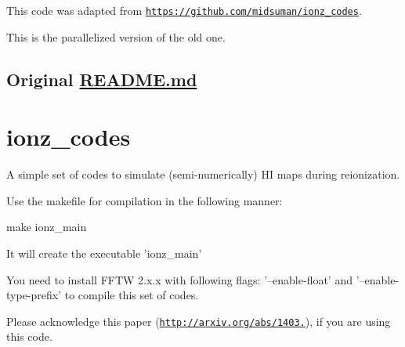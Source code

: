 This code was adapted from \href{https://github.com/midsuman/ionz_codes}{\tt https\+://github.\+com/midsuman/ionz\+\_\+codes}.

This is the parallelized version of the old one.



 \subsection*{Original \hyperlink{_r_e_a_d_m_e_8md}{R\+E\+A\+D\+M\+E.\+md} }

\section*{ionz\+\_\+codes }

A simple set of codes to simulate (semi-\/numerically) H\+I maps during reionization.

Use the makefile for compilation in the following manner\+:

make ionz\+\_\+main

It will create the executable 'ionz\+\_\+main'

You need to install F\+F\+T\+W 2.\+x.\+x with following flags\+: '--enable-\/float' and '--enable-\/type-\/prefix' to compile this set of codes.

Please acknowledge this paper (\href{http://arxiv.org/abs/1403.0941}{\tt http\+://arxiv.\+org/abs/1403.}), if you are using this code. 
